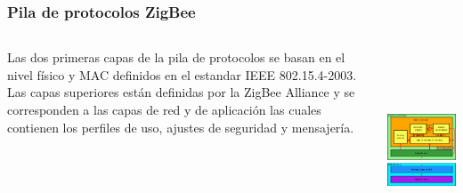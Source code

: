\documentclass[10pt,a4paper,spanish]{beamer}
\begin{document}
\begin{frame}
	\frametitle{Pila de protocolos ZigBee}
	\begin{columns}
		\begin{column}{6cm}
			Las dos primeras capas de la pila de protocolos se basan en el nivel físico y MAC definidos en el estandar IEEE 802.15.4-2003.\\

			\vspace{0.5cm}
			Las capas superiores están definidas por la ZigBee Alliance y se corresponden a las capas de red y de aplicación las cuales contienen los perfiles de uso, ajustes de seguridad y mensajería.
		\end{column}
		\begin{column}{6cm}
			\begin{center}
				\includegraphics[height=6cm]{imagenes/2.png}
			\end{center}
		\end{column}
	\end{columns}
\end{frame}
\end{document}
